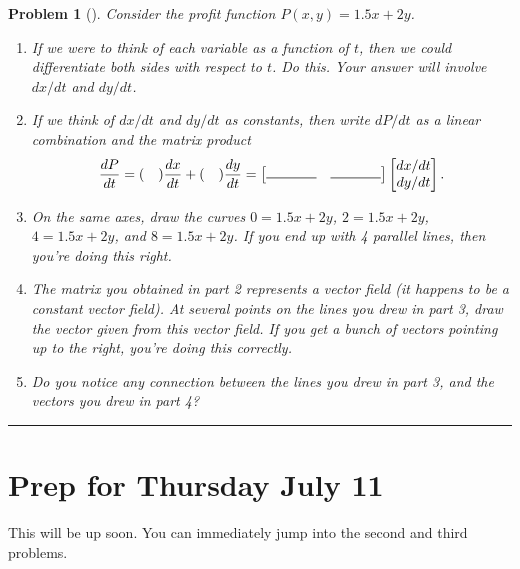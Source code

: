 \documentclass[letterpaper,oneside]{book}%
\theoremstyle{plain}
\theoremstyle{box}
\theoremstyle{problem}
\newtheorem{problemnum}{Problem}[chapter]
\newtheorem*{hwenum*}{Home Work Practice}
\newenvironment{problem}[1][]{\begin{problemnum}[#1]}{\end{problemnum}\nopagebreak\hrule\bigskip}
\newenvironment{hw*}[1][]{\begin{hwenum*}[#1]}{\end{hwenum*}\nopagebreak\hrule\bigskip}
\newcommand{\bvec}[1]{\begin{bmatrix} #1 \end{bmatrix}}
\begin{document}
\begin{problem}
 Consider the profit function $P(x,y) = 1.5x+2y$.  
 \begin{enumerate}
  \item If we were to think of each variable as a function of $t$, then we could differentiate both sides with respect to $t$. Do this.  Your answer will involve $dx/dt$ and $dy/dt$.
  \item If we think of $dx/dt$ and $dy/dt$ as constants, then write $dP/dt$ as a linear combination and the matrix product
  $$\frac{dP}{dt} = (\quad)\frac{dx}{dt}+(\quad)\frac{dy}{dt} = \bvec{\rule{.5in}{.5pt}&\rule{.5in}{.5pt}}\bvec{dx/dt\\dy/dt}.$$
  \item On the same axes, draw the curves $0=1.5x+2y$, $2=1.5x+2y$, $4=1.5x+2y$, and $8=1.5x+2y$. If you end up with 4 parallel lines, then you're doing this right. 
  \item The matrix you obtained in part 2 represents a vector field (it happens to be a constant vector field). At several points on the lines you drew in part 3, draw the vector given from this vector field. If you get a bunch of vectors pointing up to the right, you're doing this correctly.
  \item Do you notice any connection between the lines you drew in part 3, and the vectors you drew in part 4?
 \end{enumerate}

\end{problem}













\section{Prep for Thursday July 11}

\begin{hw*}
 This will be up soon.  You can immediately jump into the second and third problems.
\end{hw*}

\end{document}
